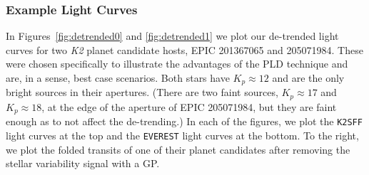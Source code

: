\documentclass[]{emulateapj}
\begin{document}
\subsubsection{Example Light Curves}
\begin{figure*}[t]
  \begin{center}
    \leavevmode
       \caption{De-trended light curves for the Campaign 1 star EPIC 201367065 \citep[K2-3,][]{CRO15}. \emph{Top}: The de-trended
                \texttt{K2SFF} flux (left) and the GP-smoothed flux folded on the period of 
                the super-Earth K2-3b (right). \emph{Bottom}: The de-trended \texttt{EVEREST}
                flux. The 6-hr CDPP is 30.9 ppm for \texttt{K2SFF} and 16.6 ppm for
                \texttt{EVEREST}, a factor of $\sim$ 2 improvement.}
     \label{fig:detrended0}
  \end{center}
\end{figure*}
\begin{figure*}[t]
  \begin{center}
    \leavevmode
       \caption{De-trended light curves for EPIC 205071984, a Campaign 2 star with three
                known planet candidates \citep{SIN15}. As in Figure~\ref{fig:detrended0}, the
                \texttt{K2SFF} light curve and the folded transit of EPIC 205071984.01
                are shown at the top; the equivalent plots for \texttt{EVEREST} are shown
                at the bottom. The 6-hr CDPP is 56.1 ppm for \texttt{K2SFF} and 24.0 ppm for
                \texttt{EVEREST}, a factor of $\gtrsim$ 2 improvement.}
     \label{fig:detrended1}
  \end{center}
\end{figure*}
In Figures~\ref{fig:detrended0} and \ref{fig:detrended1} we plot our de-trended light curves
for two \emph{K2} planet candidate hosts, EPIC 201367065 and 205071984. These were chosen
specifically to illustrate the advantages of the PLD technique and are, in a sense, best
case scenarios. Both stars have $K_p \approx 12$ and are the only bright sources in their
apertures. (There are two faint sources, $K_p \approx 17$ and $K_p \approx 18$, 
at the edge of the aperture of EPIC 205071984, but they are faint enough as to not affect
the de-trending.) In each of the figures, we plot the \texttt{K2SFF} light curves at the top
and the \texttt{EVEREST} light curves at the bottom. To the right, we plot the folded
transits of one of their planet candidates after removing the stellar variability signal with a GP.
\end{document}
